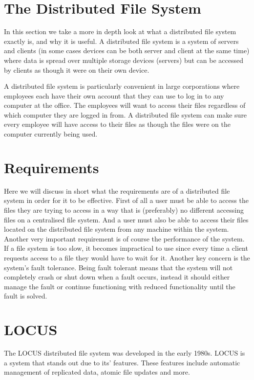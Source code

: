 \documentclass[a4paper,12px]{article}
\begin{document}
\section{The Distributed File System}

In this section we take a more in depth look at what a distributed file system
exactly is, and why it is useful. A distributed file system is a system of
servers and clients (in some cases devices can be both server and client at the
same time) where data is spread over multiple storage devices (servers) but can
be accessed by clients as though it were on their own device.\cite{concepts}

A distributed file system is particularly convenient in large corporations where
employees each have their own account that they can use to log in to any
computer at the office. The employees will want to access their files regardless
of which computer they are logged in from. A distributed file system can make
sure every employee will have access to their files as though the files were on
the computer currently being used.

\section{Requirements}

Here we will discuss in short what the requirements are of a distributed file
system in order for it to be effective. First of all a user must be able to
access the files they are trying to access in a way that is (preferably) no
different accessing files on a centralised file system. And a user must also be
able to access their files located on the distributed file system from any
machine within the system.\cite{concepts} Another very important requirement is
of course the performance of the system. If a file system is too slow, it
becomes impractical to use since every time a client requests access to a file
they would have to wait for it. Another key concern is the system's fault
tolerance. Being fault tolerant means that the system will not completely crash
or shut down when a fault occurs, instead it should either manage the fault or
continue functioning with reduced functionality until the fault is
solved.\cite{concepts}

\section{LOCUS}

The LOCUS distributed file system was developed in the early 1980s. LOCUS is a
system that stands out due to its' features. These features include automatic
management of replicated data, atomic file updates and more.
\end{document}
